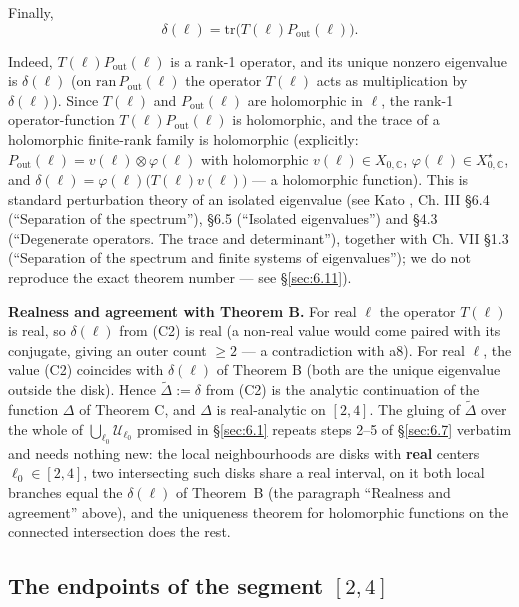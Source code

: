 Finally,
\begin{equation*}
\delta(\ell)=\mathrm{tr}\bigl(T(\ell)P_{\mathrm{out}}(\ell)\bigr).
\tag{C2}
\end{equation*}

Indeed, $T(\ell)P_{\mathrm{out}}(\ell)$ is a rank-1 operator, and its unique
nonzero eigenvalue is $\delta(\ell)$ (on $\mathrm{ran}\,P_{\mathrm{out}}(\ell)$
the operator $T(\ell)$ acts as multiplication by $\delta(\ell)$). Since
$T(\ell)$ and $P_{\mathrm{out}}(\ell)$ are holomorphic in $\ell$, the rank-1
operator-function $T(\ell)P_{\mathrm{out}}(\ell)$ is holomorphic, and the
trace of a holomorphic finite-rank family is holomorphic (explicitly:
$P_{\mathrm{out}}(\ell)=v(\ell)\otimes\varphi(\ell)$ with holomorphic
$v(\ell)\in X_{0,\mathbb C}$, $\varphi(\ell)\in X_{0,\mathbb C}^{\star}$, and
$\delta(\ell)=\varphi(\ell)\bigl(T(\ell)v(\ell)\bigr)$ --- a holomorphic
function). This is standard perturbation theory of an isolated eigenvalue
(see Kato \cite{kato1976perturbation},
Ch. III \S6.4 (``Separation of the spectrum''), \S6.5
(``Isolated eigenvalues'') and \S4.3 (``Degenerate operators. The trace
and determinant''), together with Ch. VII \S1.3 (``Separation of the
spectrum and finite systems of eigenvalues''); we do not reproduce the exact theorem
number --- see \S\ref{sec:6.11}).

\textbf{Realness and agreement with Theorem B.} For real $\ell$ the operator
$T(\ell)$ is real, so $\delta(\ell)$ from (C2) is real (a non-real value
would come paired with its conjugate, giving an outer count $\ge2$ --- a
contradiction with a8). For real $\ell$, the value (C2) coincides with
$\delta(\ell)$ of Theorem B (both are the unique eigenvalue outside the
disk). Hence $\widetilde\Delta:=\delta$ from (C2) is the analytic
continuation of the function $\Delta$ of Theorem C, and $\Delta$ is real-analytic on $[2,4]$. The gluing of $\widetilde\Delta$ over the whole of $\bigcup_{\ell_0}\mathcal U_{\ell_0}$ promised in \S\ref{sec:6.1} repeats steps 2--5 of \S\ref{sec:6.7} verbatim and needs nothing new: the local neighbourhoods are disks with \textbf{real} centers $\ell_0\in[2,4]$, two intersecting such disks share a real interval, on it both local branches equal the $\delta(\ell)$ of Theorem~B (the paragraph ``Realness and agreement'' above), and the uniqueness theorem for holomorphic functions on the connected intersection does the rest.


\subsection{The endpoints of the segment $[2,4]$}
\label{sec:6.9}

